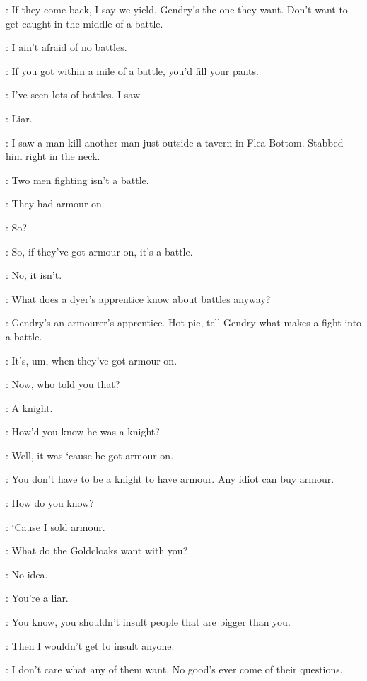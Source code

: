 \LOMMY: If they come back, I say we yield. Gendry's the one they want. Don't want to get caught in the middle of a battle.

\HOTPIE: I ain't afraid of no battles.

\ARYA: If you got within a mile of a battle, you'd fill your pants.

\HOTPIE: I've seen lots of battles. I saw---

\ARYA: Liar.

\HOTPIE: I saw a man kill another man just outside a tavern in Flea Bottom. Stabbed him right in the neck.

\LOMMY: Two men fighting isn't a battle.

\HOTPIE: They had armour on.

\ARYA: So?

\HOTPIE: So, if they've got armour on, it's a battle.

\LOMMY: No, it isn't.

\HOTPIE: What does a dyer's apprentice know about battles anyway?


\ARYA: Gendry's an armourer's apprentice. Hot pie, tell Gendry what makes a fight into a battle.

\HOTPIE: It's, um, when they've got armour on.

\GENDRY: Now, who told you that?

\HOTPIE: A knight.

\GENDRY: How'd you know he was a knight?

\HOTPIE: Well, it was `cause he got armour on.

\GENDRY: You don't have to be a knight to have armour. Any idiot can buy armour.

\HOTPIE: How do you know?

\GENDRY: `Cause I sold armour.


\ARYA: What do the Goldcloaks want with you?

\GENDRY: No idea.

\ARYA: You're a liar.

\GENDRY: You know, you shouldn't insult people that are bigger than you.

\ARYA: Then I wouldn't get to insult anyone.

\GENDRY: I don't care what any of them want. No good's ever come of their questions.

